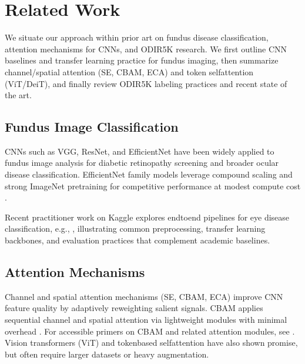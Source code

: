 \chapter{Related Work}
We situate our approach within prior art on fundus disease classification, attention mechanisms for CNNs, and ODIR\textendash 5K research. We first outline CNN baselines and transfer learning practice for fundus imaging, then summarize channel/spatial attention (SE, CBAM, ECA) and token self\textendash attention (ViT/DeiT), and finally review ODIR\textendash 5K labeling practices and recent state of the art.
\section{Fundus Image Classification}
CNNs such as VGG, ResNet, and EfficientNet have been widely applied to fundus image analysis for diabetic retinopathy screening and broader ocular disease classification. EfficientNet family models leverage compound scaling and strong ImageNet pretraining for competitive performance at modest compute cost \cite{tan2019efficientnet}.

Recent practitioner work on Kaggle explores end\textendash to\textendash end pipelines for eye disease classification, e.g., \cite{waleedKaggleEyes}, illustrating common preprocessing, transfer learning backbones, and evaluation practices that complement academic baselines.

\section{Attention Mechanisms}
Channel and spatial attention mechanisms (SE, CBAM, ECA) improve CNN feature quality by adaptively reweighting salient signals. CBAM applies sequential channel and spatial attention via lightweight modules with minimal overhead \cite{woo2018cbam}. For accessible primers on CBAM and related attention modules, see \cite{cbamMedium, cbamDO}. Vision transformers (ViT) and token\textendash based self\textendash attention have also shown promise, but often require larger datasets or heavy augmentation.

